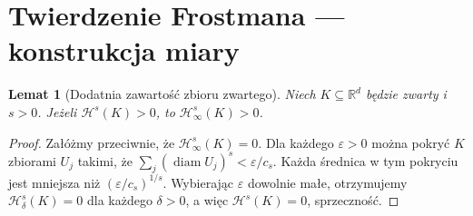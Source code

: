 \documentclass[11pt,a4paper,oneside]{book}
\numberwithin{equation}{chapter}
\theoremstyle{plain}
\newtheorem{lemat}[twierdzenie]{Lemat}
\theoremstyle{definition}
\theoremstyle{remark}
\begin{document}
\section{Twierdzenie Frostmana — konstrukcja miary}
\begin{lemat}[Dodatnia zawartość zbioru zwartego]
\label{lem:positive-content-26}
Niech $K\subseteq\mathbb R^d$ będzie zwarty i $s>0$.
Jeżeli $\mathcal H^s(K)>0$, to
$\mathcal H^s_\infty(K)>0$.
\end{lemat}
\begin{proof}
Załóżmy przeciwnie, że $\mathcal H^s_\infty(K)=0$.
Dla każdego $\varepsilon>0$ można pokryć $K$
zbiorami $U_j$ takimi, że
$\sum_j(\operatorname{diam}U_j)^s<\varepsilon/c_s$.
Każda średnica w tym pokryciu jest mniejsza niż
$(\varepsilon/c_s)^{1/s}$. Wybierając
$\varepsilon$ dowolnie małe, otrzymujemy
$\mathcal H^s_\delta(K)=0$ dla każdego $\delta>0$,
a więc $\mathcal H^s(K)=0$, sprzeczność.
\end{proof}
\end{document}
